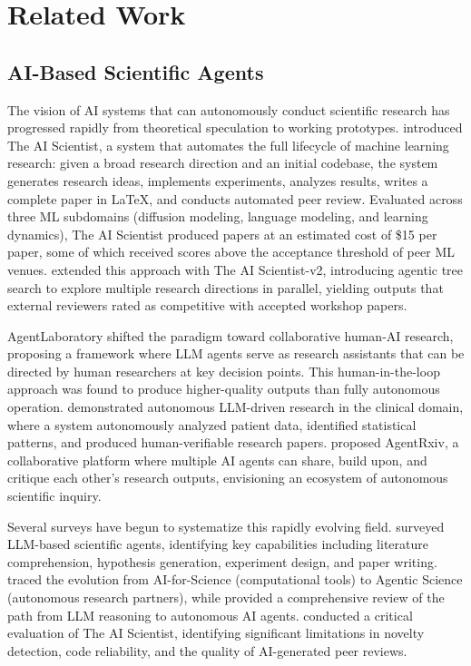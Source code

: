 \documentclass{article}
\begin{document}
\section{Related Work}

\subsection{AI-Based Scientific Agents}

The vision of AI systems that can autonomously conduct scientific research has progressed rapidly from theoretical speculation to working prototypes. \citet{lu2024ai_scientist} introduced The AI Scientist, a system that automates the full lifecycle of machine learning research: given a broad research direction and an initial codebase, the system generates research ideas, implements experiments, analyzes results, writes a complete paper in \LaTeX, and conducts automated peer review. Evaluated across three ML subdomains (diffusion modeling, language modeling, and learning dynamics), The AI Scientist produced papers at an estimated cost of \$15 per paper, some of which received scores above the acceptance threshold of peer ML venues. \citet{yamada2025ai_scientist_v2} extended this approach with The AI Scientist-v2, introducing agentic tree search to explore multiple research directions in parallel, yielding outputs that external reviewers rated as competitive with accepted workshop papers.

AgentLaboratory \citep{schmidgall2025agentlab} shifted the paradigm toward collaborative human-AI research, proposing a framework where LLM agents serve as research assistants that can be directed by human researchers at key decision points. This human-in-the-loop approach was found to produce higher-quality outputs than fully autonomous operation. \citet{ifargan2025autonomous} demonstrated autonomous LLM-driven research in the clinical domain, where a system autonomously analyzed patient data, identified statistical patterns, and produced human-verifiable research papers. \citet{schmidgall2025agentrxiv} proposed AgentRxiv, a collaborative platform where multiple AI agents can share, build upon, and critique each other's research outputs, envisioning an ecosystem of autonomous scientific inquiry.

Several surveys have begun to systematize this rapidly evolving field. \citet{ren2025scientific_intelligence} surveyed LLM-based scientific agents, identifying key capabilities including literature comprehension, hypothesis generation, experiment design, and paper writing. \citet{wei2025agentic_science} traced the evolution from AI-for-Science (computational tools) to Agentic Science (autonomous research partners), while \citet{ferrag2025llm_agents} provided a comprehensive review of the path from LLM reasoning to autonomous AI agents. \citet{beel2025evaluating} conducted a critical evaluation of The AI Scientist, identifying significant limitations in novelty detection, code reliability, and the quality of AI-generated peer reviews.
\end{document}
